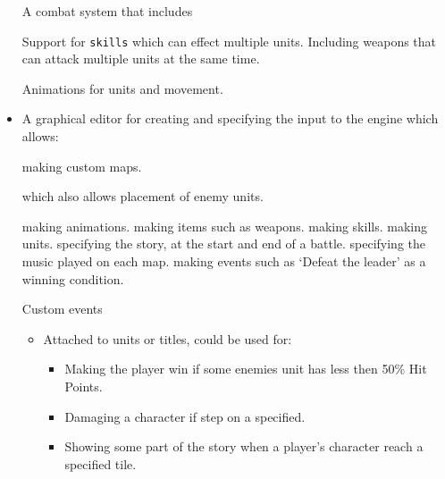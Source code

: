 \begin{itemize}
	
	\tick A combat system that includes 
	\begin{itemize}
		\tick Support for \texttt{skills} which can effect multiple units.
		\tick Including weapons that can attack multiple units at the same time. 
	\end{itemize}
	
	\tick Animations for units and movement.
	
	\item A graphical editor for  creating and specifying the input to the engine which allows:
	\begin{itemize}
		\tick   making custom maps.
		\begin{itemize}
			\tick which also allows placement of enemy units.
		\end{itemize}
		\tick   making animations.
		\tick   making items such as weapons.
		\tick   making skills. 
		\tick   making units.
		\tick   specifying the story, at the start and end of a battle.
		\cross  specifying the music played on each map.
		\cross  making events such as `Defeat the leader' as a winning condition.
	\end{itemize}
	
	\cross Custom events
	\begin{itemize}
		\item Attached to units or titles, could be used for:
		\begin{itemize}
			\item Making the player win if some enemies unit has less then 50\% Hit Points.
			\item Damaging a character if step on a specified.
			\item Showing some part of the story when a player's character reach a specified tile.
		\end{itemize}
	\end{itemize}
	
\end{itemize}